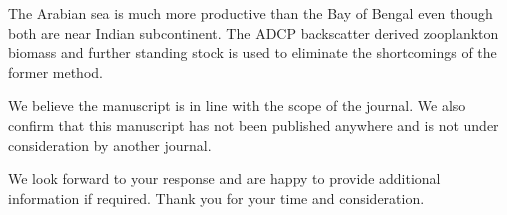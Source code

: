 \documentclass[11pt,a4paper,roman]{moderncv}        %
\begin{document}
		
	The Arabian sea is much more productive than the Bay of Bengal even though both are near Indian subcontinent.  The ADCP backscatter derived zooplankton biomass and further standing stock is used to eliminate the shortcomings of the former method.
	
	
	We believe the manuscript is in line with the scope of the journal. We also confirm that this manuscript has not been published anywhere and is not under consideration by another journal.
	
	We look forward to your response and are happy to provide additional information if required. Thank you for your time and consideration.
	
	\makeletterclosing
	
\end{document}
